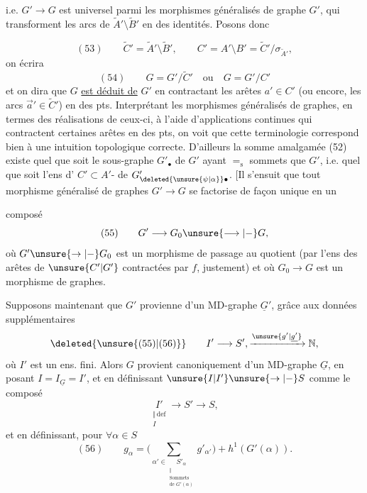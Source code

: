 i.e. $G'\longrightarrow G$ est universel parmi les morphismes généralisés de  graphe $G'$, qui transforment les arcs de $\widetilde A'\setminus\widetilde B'$ en des identités. Posons donc

\[
(53)\qquad\widetilde C'=\widetilde A'\setminus\widetilde B',\qquad C'=A'\setminus B'=\widetilde C'/\sigma_{\widetilde A'},
\]
on écrira
\[
(54)\qquad G=G'/\widetilde C'\quad\text{ou}\quad G=G'/C'
\]
et on dira que $G$ \uline{est déduit de} $G'$ en contractant les arêtes $a'\in C'$ (ou encore, les arcs $\vec a'\in\widetilde C'$) en des pts. Interprétant les morphismes généralisés de graphes, en termes des réalisations  de ceux-ci, à l'aide d'applications continues qui contractent  certaines arêtes en des pts, on voit que cette terminologie correspond bien à une intuition topologique correcte. D'ailleurs la somme amalgamée (52) existe quel que soit le sous-graphe $G'_\bullet$ de $G'$ ayant $=_{\mathrm s}$ sommets que $G'$, i.e. quel que soit l'ens d' $C'\subset A'$- de $G'_{\deleted{\unsure{\psi|\alpha}}\bullet}$. [Il s'ensuit que tout morphisme généralisé de graphes $G'\longrightarrow G$ se factorise de façon unique en un

composé
\[
(55)\qquad G'\longrightarrow G_0\unsure{\longrightarrow|{-}}G,
\]
où $G'\unsure{\to|{-}}G_0$ est un morphisme de passage au quotient (par l'ens des arêtes de $\unsure{C'|G'}$ contractées par $f$, justement) et où $G_0\longrightarrow G$ est un morphisme  de graphes.

Supposons maintenant que $G'$   provienne  d'un MD-graphe $\underline G'$, grâce aux données supplémentaires
\[
\deleted{\unsure{(55)|(56)}}\qquad I'\longrightarrow S',\xrightarrow{\unsure{g'|\underline{g'}}}\mathbb N,
\]
où $I'$ est un ens. fini. Alors $G$ provient canoniquement d'un MD-graphe $\underline G$, en posant $I=I_{\underline G}=I'$, et en définissant $\unsure{I|I'}\unsure{\to|{-}}S$ comme le composé
\[
\underset{\substack{\Vert\,\mathrm{def}\\I}}{I'}\longrightarrow S'\longrightarrow S,
\]
et en définissant, pour $\forall\alpha\in S$
\[
(56)\qquad g_\alpha=\Big(\sum_{\alpha'\in\underset{\substack{\Vert\\\text{Sommets}\\\text{de }G'(\alpha)}}{S'_\alpha}}g'_{\alpha'}\Big)+h^1(G'(\alpha)).
\]

